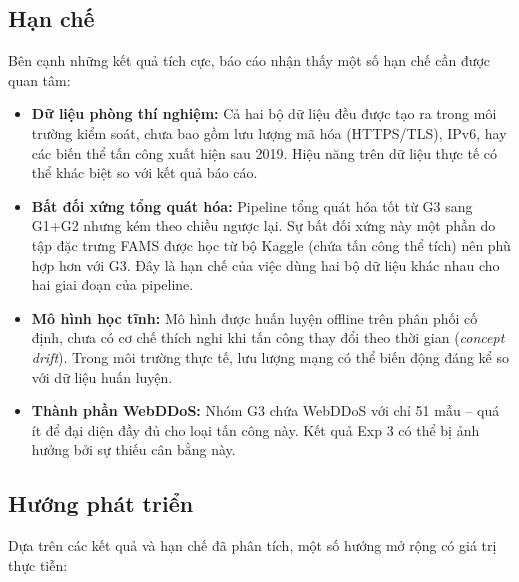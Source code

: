 \subsection{Hạn chế}

Bên cạnh những kết quả tích cực, báo cáo nhận thấy một số hạn chế cần được quan tâm:

\begin{itemize}
    \item \textbf{Dữ liệu phòng thí nghiệm:} Cả hai bộ dữ liệu đều được tạo ra trong môi trường kiểm soát, chưa bao gồm lưu lượng mã hóa (HTTPS/TLS), IPv6, hay các biến thể tấn công xuất hiện sau 2019. Hiệu năng trên dữ liệu thực tế có thể khác biệt so với kết quả báo cáo.

    \item \textbf{Bất đối xứng tổng quát hóa:} Pipeline tổng quát hóa tốt từ G3 sang G1+G2 nhưng kém theo chiều ngược lại. Sự bất đối xứng này một phần do tập đặc trưng FAMS được học từ bộ Kaggle (chứa tấn công thể tích) nên phù hợp hơn với G3. Đây là hạn chế của việc dùng hai bộ dữ liệu khác nhau cho hai giai đoạn của pipeline.

    \item \textbf{Mô hình học tĩnh:} Mô hình được huấn luyện offline trên phân phối cố định, chưa có cơ chế thích nghi khi tấn công thay đổi theo thời gian (\textit{concept drift}). Trong môi trường thực tế, lưu lượng mạng có thể biến động đáng kể so với dữ liệu huấn luyện.

    \item \textbf{Thành phần WebDDoS:} Nhóm G3 chứa WebDDoS với chỉ 51 mẫu -- quá ít để đại diện đầy đủ cho loại tấn công này. Kết quả Exp 3 có thể bị ảnh hưởng bởi sự thiếu cân bằng này.
\end{itemize}

\subsection{Hướng phát triển}

Dựa trên các kết quả và hạn chế đã phân tích, một số hướng mở rộng có giá trị thực tiễn:


